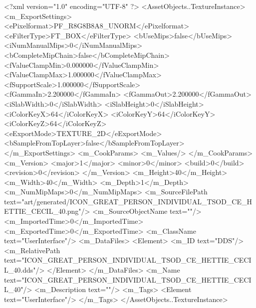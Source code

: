 <?xml version="1.0" encoding="UTF-8" ?>
<AssetObjects..TextureInstance>
	<m_ExportSettings>
		<ePixelformat>PF_R8G8B8A8_UNORM</ePixelformat>
		<eFilterType>FT_BOX</eFilterType>
		<bUseMips>false</bUseMips>
		<iNumManualMips>0</iNumManualMips>
		<bCompleteMipChain>false</bCompleteMipChain>
		<fValueClampMin>0.000000</fValueClampMin>
		<fValueClampMax>1.000000</fValueClampMax>
		<fSupportScale>1.000000</fSupportScale>
		<fGammaIn>2.200000</fGammaIn>
		<fGammaOut>2.200000</fGammaOut>
		<iSlabWidth>0</iSlabWidth>
		<iSlabHeight>0</iSlabHeight>
		<iColorKeyX>64</iColorKeyX>
		<iColorKeyY>64</iColorKeyY>
		<iColorKeyZ>64</iColorKeyZ>
		<eExportMode>TEXTURE_2D</eExportMode>
		<bSampleFromTopLayer>false</bSampleFromTopLayer>
	</m_ExportSettings>
	<m_CookParams>
		<m_Values/>
	</m_CookParams>
	<m_Version>
		<major>1</major>
		<minor>0</minor>
		<build>0</build>
		<revision>0</revision>
	</m_Version>
	<m_Height>40</m_Height>
	<m_Width>40</m_Width>
	<m_Depth>1</m_Depth>
	<m_NumMipMaps>0</m_NumMipMaps>
	<m_SourceFilePath text="art/generated/ICON_GREAT_PERSON_INDIVIDUAL_TSOD_CE_HETTIE_CECIL_40.png"/>
	<m_SourceObjectName text=""/>
	<m_ImportedTime>0</m_ImportedTime>
	<m_ExportedTime>0</m_ExportedTime>
	<m_ClassName text="UserInterface"/>
	<m_DataFiles>
		<Element>
			<m_ID text="DDS"/>
			<m_RelativePath text="ICON_GREAT_PERSON_INDIVIDUAL_TSOD_CE_HETTIE_CECIL_40.dds"/>
		</Element>
	</m_DataFiles>
	<m_Name text="ICON_GREAT_PERSON_INDIVIDUAL_TSOD_CE_HETTIE_CECIL_40"/>
	<m_Description text=""/>
	<m_Tags>
		<Element text="UserInterface"/>
	</m_Tags>
</AssetObjects..TextureInstance>
